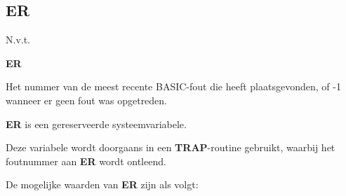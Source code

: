 \subsection{ER}
\begin{description}[leftmargin=2cm,style=nextline]
\item [Token:]    N.v.t.

\item [Formaat:]   {\bf ER}

\item [Gebruik:]    Het nummer van de meest recente BASIC-fout die heeft plaatsgevonden, of -1 wanneer er geen fout was opgetreden.

\item [Opmerkingen:]  {\bf ER} is een gereserveerde systeemvariabele.

                  Deze variabele wordt doorgaans in een {\bf TRAP}-routine gebruikt, waarbij het foutnummer aan {\bf ER} wordt ontleend.

                  De mogelijke waarden van {\bf ER} zijn als volgt:


\end{description}
